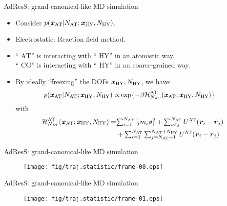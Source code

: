 \documentclass[]{beamer}
\newcommand{\bluec}[1]{{\color{blue} #1}}
\newcommand{\vect}[1]{\textbf{\textit{#1}}}
\newcommand{\AT}{{\textrm{{AT}}}}
\newcommand{\EX}{{\textrm{AT}}}
\newcommand{\CG}{{\textrm{CG}}}
\newcommand{\HY}{{\textrm{HY}}}
\begin{document}
\begin{frame}{AdResS: grand-canonical-like MD simulation}
  \begin{itemize}
    \vfill
  \item <1-> Consider \bluec{$p(\vect x_\AT \vert N_\AT; \vect x_\HY, N_\HY)$}.
    \vfill
  \item <2-> Electrostatic: Reaction field method.
    \vfill
  \item <3->
     ``\bluec{$\AT$}''  is interacting with
    ``\bluec{$\HY$}'' in an atomistic way.\\
    ``\bluec{$\CG$}''  is interacting with
    ``\bluec{$\HY$}'' in an coarse-grained way.
    \vfill
  \item <4-> By ideally ``freezing'' the DOFs \bluec{$\vect x_\HY, N_\HY$}, we have:
    \bluec{
      \begin{align*}
        p(\vect x_\AT \vert N_\AT; \vect x_\HY, N_\HY) \propto&
        \exp\{-\beta \mathcal H^\EX_{N_\AT}(\vect x_\AT; \vect x_\HY, N_\HY)\}
      \end{align*}
    }
    with
    \bluec{
      \begin{align*}
        \mathcal H^\EX_{N_\AT}(\vect x_\AT; \vect x_\HY, N_\HY) 
        =&
        {\mathsmaller{
            \sum_{i=1}^{N_\AT}\frac12 m_i\vect v_i^2 +
            \sum_{i<j}^{N_\AT}U^\EX(\vect r_i - \vect r_j) }}\\
        &+ \mathsmaller{
        \sum_{i=1}^{N_\AT}\sum_{j=N_\AT+1}^{N_\AT + N_\HY}U^\EX(\vect r_i - \vect r_j)}
      \end{align*}
    }
    \vfill
  \end{itemize}
\end{frame}


\begin{frame}{AdResS: grand-canonical-like MD simulation}
  \begin{minipage}[t][8cm][t]{1.0\linewidth}
    \begin{figure}[t]
      \centering
      \texttt{[image: fig/traj.statistic/frame-00.eps]}
    \end{figure}
  \end{minipage}
\end{frame}

\begin{frame}{AdResS: grand-canonical-like MD simulation}
  \addtocounter{framenumber}{-1}
  \begin{minipage}[t][8cm][t]{1.0\linewidth}
    \begin{figure}[t]
      \centering
      \texttt{[image: fig/traj.statistic/frame-01.eps]}
    \end{figure}
  \end{minipage}
\end{frame}
\end{document}
